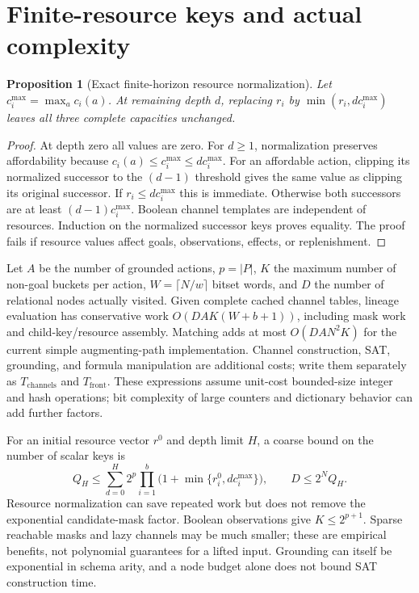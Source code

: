 \documentclass[11pt]{article}
\newtheorem{proposition}[theorem]{Proposition}
\theoremstyle{definition}
\newcommand{\card}[1]{\lvert #1\rvert}
\begin{document}
\section{Finite-resource keys and actual complexity}
\begin{proposition}[Exact finite-horizon resource normalization]
Let $c_i^{\max}=\max_a c_i(a)$. At remaining depth $d$, replacing
$r_i$ by $\min(r_i,d c_i^{\max})$ leaves all three complete capacities unchanged.
\end{proposition}
\begin{proof}
At depth zero all values are zero. For $d\geq1$, normalization preserves
affordability because $c_i(a)\leq c_i^{\max}\leq d c_i^{\max}$. For an
affordable action, clipping its normalized successor to the $(d-1)$ threshold
gives the same value as clipping its original successor. If $r_i\leq
d c_i^{\max}$ this is immediate. Otherwise both successors are at least
$(d-1)c_i^{\max}$. Boolean channel templates are independent of resources.
Induction on the normalized successor keys proves equality. The proof fails
if resource values affect goals, observations, effects, or replenishment.
\end{proof}

Let $A$ be the number of grounded actions, $p=\card P$, $K$ the maximum number
of non-goal buckets per action, $W=\lceil N/w\rceil$ bitset words, and $D$ the
number of relational nodes actually visited. Given complete cached channel
tables, lineage evaluation has conservative work
$O(D A K(W+b+1))$, including mask work and child-key/resource assembly.
Matching adds at most $O(D A N^2K)$ for the current simple augmenting-path
implementation. Channel construction, SAT, grounding, and formula manipulation
are additional costs; write them separately as $T_{\mathrm{channels}}$ and
$T_{\mathrm{front}}$. These expressions assume unit-cost bounded-size integer
and hash operations; bit complexity of large counters and dictionary behavior
can add further factors.

For an initial resource vector $r^0$ and depth limit $H$, a coarse bound on
the number of scalar keys is
\[
Q_H\leq\sum_{d=0}^{H}2^p\prod_{i=1}^{b}
             \bigl(1+\min\{r_i^0,d c_i^{\max}\}\bigr),
\qquad D\leq 2^N Q_H.
\]
Resource normalization can save repeated work but does not remove the
exponential candidate-mask factor. Boolean observations give
$K\leq2^{p+1}$. Sparse reachable masks and lazy channels may be much smaller;
these are empirical benefits, not polynomial guarantees for a lifted input.
Grounding can itself be exponential in schema arity, and a node budget alone
does not bound SAT construction time.
\end{document}
